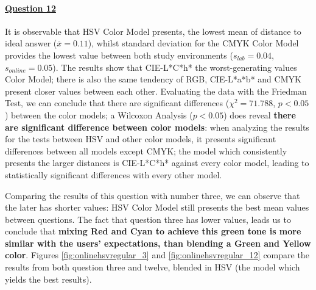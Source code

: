 \paragraph{\ul{Question 12}}
%
It is observable that HSV Color Model presents, the lowest mean of distance to ideal answer ($\overline{x} = 0.11$), whilst standard deviation for the CMYK Color Model provides the lowest value between both study environments
($s_{lab} = 0.04$, $s_{online} = 0.05$).
The results show that CIE-L*C*h* the worst-generating values Color Model; there is also the same tendency of RGB, CIE-L*a*b* and CMYK present closer values between each other. Evaluating the data with the Friedman Test, we can conclude that there are significant differences ($\chi^2 = 71.788$, $p < 0.05$)
between the color models; a Wilcoxon Analysis ($p < 0.05$) does reveal \textbf{there are significant difference between color models}: when analyzing the results for the tests between HSV and other
color models, it presents significant differences between all models except CMYK; the model which consistently presents the larger distances is CIE-L*C*h* against every color model, leading to
statistically significant differences with every other model. \par
%
Comparing the results of this question with number three, we can observe that the later has shorter values: HSV Color Model still presents the best mean values between questions.
The fact that question three has lower values, leads us to conclude that \textbf{mixing Red and Cyan to achieve this green tone is more similar with the users' expectations, than blending a Green and
Yellow color}. Figures \ref{fig:onlinehsvregular_3} and \ref{fig:onlinehsvregular_12} compare the results from both question three and twelve, blended in HSV (the model which yields the best results).
%

